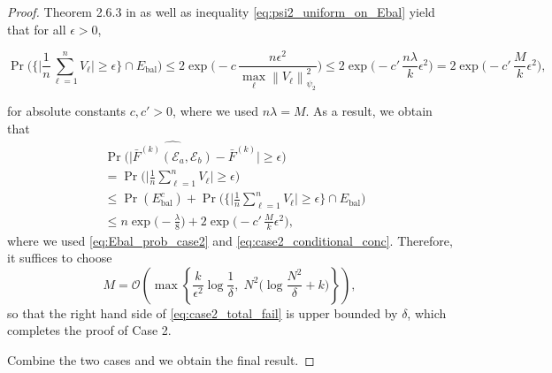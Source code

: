 \documentclass[aps,prx,reprint,superscriptaddress,amsmath,amssymb,longbibliography,floatfix]{revtex4-2}
\newcommand{\norm}[1]{\left \lVert #1 \right \rVert}
\newcommand{\abs}[1]{\lvert #1\rvert}
\newcommand{\scE}{\mathcal{E}}
\theoremstyle{plain}
\theoremstyle{definition}
\theoremstyle{remark}
\begin{document}
\begin{proof}
    Theorem 2.6.3 in \cite{Vershynin_high_dimensional_probability} as well as inequality \eqref{eq:psi2_uniform_on_Ebal}
    yield that for all $\epsilon>0$,
    \begin{widetext}
\begin{equation}\label{eq:case2_conditional_conc}
    \Pr\Big( \bigl\{\abs{\frac{1}{n}\sum_{\ell=1}^{n}V_\ell}\ge \epsilon \bigl\} \cap E_{\mathrm{bal}}  \Big)
    \le
    2\exp\!\Big(-c\,\frac{n\epsilon^2}{\max_\ell \norm{V_\ell}_{\psi_2}^2}\Big)
    \le
    2\exp\!\Big(-c'\,\frac{n\lambda}{k}\epsilon^2\Big)
    =
    2\exp\!\Big(-c'\,\frac{M}{k}\epsilon^2\Big),
    \end{equation}
\end{widetext}
    for absolute constants $c,c'>0$, where we used $n\lambda=M$.
    \clearpage
    As a result, we obtain that 
    \begin{align}
&\Pr\Big(\abs{\widehat{\bar{F}^{(k)}(\scE_a,\scE_b)}-\bar{F}^{(k)}}\ge \epsilon\Big)
    \nonumber\\
    &=
    \Pr\Big(\abs{\frac{1}{n}\sum_{\ell=1}^{n}V_\ell}\ge \epsilon\Big)\nonumber\\
    &\le
    \Pr(E_{\mathrm{bal}}^c)
    +
    \Pr\Big(\bigl\{\abs{\frac{1}{n}\sum_{\ell=1}^{n}V_\ell}\ge \epsilon \bigl\} \cap E_{\mathrm{bal}}\Big)\nonumber\\
    &\le
    n\exp\!\Big(-\frac{\lambda}{8}\Big)
    +
    2\exp\!\Big(-c'\,\frac{M}{k}\epsilon^2\Big),\label{eq:case2_total_fail}
\end{align}
    where we used \eqref{eq:Ebal_prob_case2} and \eqref{eq:case2_conditional_conc}. Therefore, it suffices to choose 
    \begin{equation}
    M
    =
    \mathcal O\!\left(
    \max\left\{
    \frac{k}{\epsilon^2}\log\frac{1}{\delta},
    \;
    N^2\Big(\log\frac{N^2}{\delta}+k\Big)
    \right\}
    \right),
\label{eq:app-local-mmd-dense-samples}
\end{equation}
so that the right hand side of  \eqref{eq:case2_total_fail} is upper bounded by
$\delta$, which completes the proof of Case 2.

Combine the two cases and we obtain the final result.








\vspace{5mm}







\end{proof}
\end{document}
